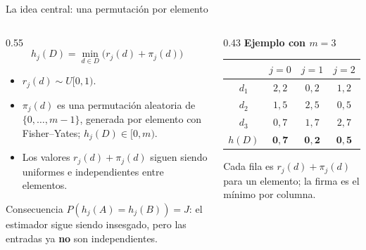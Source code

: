 \documentclass[aspectratio=169,11pt]{beamer}
\begin{document}
\begin{frame}{La idea central: una permutaci\'on por elemento}
  \small
  \begin{columns}[T]
    \begin{column}{0.55\textwidth}
      \[
        h_j(D)=\min_{d\in D}\bigl(r_j(d)+\pi_j(d)\bigr)
      \]
      \begin{itemize}
        \item $r_j(d)\sim U[0,1)$.
        \item $\pi_j(d)$ es una permutaci\'on aleatoria de
              $\{0,\ldots,m-1\}$, generada por elemento con
              Fisher--Yates; $h_j(D)\in[0,m)$.
        \item Los valores $r_j(d)+\pi_j(d)$ siguen siendo uniformes e
              independientes entre elementos.
      \end{itemize}
      \vspace{0.3em}
      \begin{block}{Consecuencia}
        \small
        $P(h_j(A)=h_j(B))=J$: el estimador sigue siendo insesgado, pero las
        entradas ya \textbf{no} son independientes.
      \end{block}
    \end{column}
    \begin{column}{0.43\textwidth}
      \centering
      \small
      \textbf{Ejemplo con $m=3$}\\[0.6em]
      \begin{tabular}{c|ccc}
        \toprule
         & $j=0$ & $j=1$ & $j=2$\\
        \midrule
        $d_1$ & $2{,}2$ & $0{,}2$ & $1{,}2$\\
        $d_2$ & $1{,}5$ & $2{,}5$ & $0{,}5$\\
        $d_3$ & $0{,}7$ & $1{,}7$ & $2{,}7$\\
        \midrule
        $h(D)$ & $\mathbf{0{,}7}$ & $\mathbf{0{,}2}$ & $\mathbf{0{,}5}$\\
        \bottomrule
      \end{tabular}
      \vspace{0.5em}

      \footnotesize
      Cada fila es $r_j(d)+\pi_j(d)$ para un elemento;
      la firma es el m\'inimo por columna.
    \end{column}
  \end{columns}
\end{frame}
\end{document}
